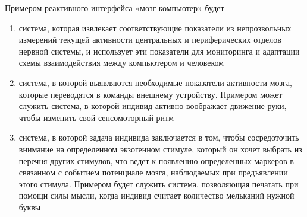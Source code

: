 
Примером реактивного интерфейса «мозг-компьютер» будет

\begin{enumerate}
    \item система, которая извлекает соответствующие показатели из непрозвольных измерений текущей активности центральных и периферических отделов нервной системы, и использует эти показатели для мониторинга и адаптации схемы взаимодействия между компьютером и человеком
    \item система, в которой выявляются необходимые показатели активности мозга, которые переводятся в команды внешнему устройству. Примером может служить система, в которой индивид активно воображает движение руки, чтобы изменить свой сенсомоторный ритм
    \item система, в которой задача индивида заключается в том, чтобы сосредоточить внимание на определенном экзогенном стимуле, который он хочет выбрать из перечня других стимулов, что ведет к появлению определенных маркеров в связанном с событием потенциале мозга, наблюдаемых при предъявлении этого стимула. Примером будет служить система, позволяющая печатать при помощи силы мысли, когда индивид считает количество мельканий нужной буквы
\end{enumerate}